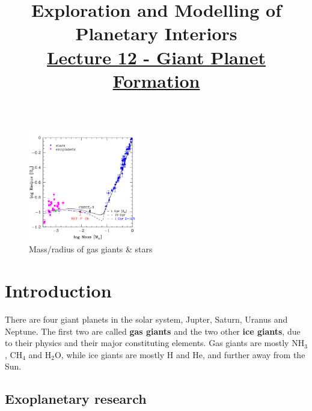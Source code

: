 \documentclass[12pt]{article} %
\title{\large{\vspace{-5ex}\textbf{Exploration and Modelling of Planetary Interiors}}\newline\\{\textbf{\underline{Lecture 12 - Giant Planet Formation}}}\vspace{-7ex}}
\author{}
\date{} %
\begin{document}
\begingroup
\let\center\flushleft
\let\endcenter\endflushleft
\maketitle
\endgroup

\begingroup
\let\cleardoublepage\relax
\let\clearpage\relax
\tableofcontents
\endgroup

\begin{figure}
\begin{center}
 \includegraphics[width=0.45\textwidth,keepaspectratio=true]{./images/physics_stackexchange_com_questions_165283_gas_giant_six_times_more_massive}
 \caption{Mass/radius of gas giants \& stars \cite{Jeffries:2015:Online}}
 \label{gas_giants_vs_stars}
\end{center}
\end{figure}

\section{Introduction}\vspace{-2ex}\titlerule[1pt]\bigskip

There are four giant planets in the solar system, Jupter, Saturn, Uranus and Neptune. The first two are called \textbf{gas giants} and the two other \textbf{ice giants}, due to their physics and their major constituting elements. Gas giants are mostly NH$_3$, CH$_4$ and H$_2$O, while ice giants are mostly H and He, and further away from the Sun.

\subsection{Exoplanetary research}\vspace{-1ex}\bigskip
\end{document}
